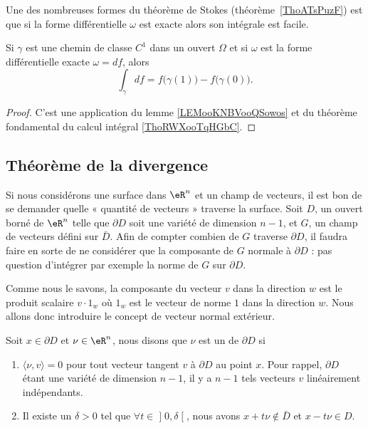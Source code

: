Une des nombreuses formes du théorème de Stokes (théorème~\ref{ThoATsPuzF}) est que si la forme différentielle \( \omega\) est exacte alors son intégrale est facile.
\begin{theorem} \label{ThoUJMhFwU}
	Si \( \gamma\) est une chemin de classe \( C^1\) dans un ouvert \( \Omega\) et si \( \omega\) est la forme différentielle exacte \( \omega=df\), alors
	\begin{equation}
		\int_{\gamma}df=f\big( \gamma(1) \big)-f\big( \gamma(0) \big).
	\end{equation}
\end{theorem}

\begin{proof}
	C'est une application du lemme \ref{LEMooKNBVooQSowos} et du théorème fondamental du calcul intégral \ref{ThoRWXooTqHGbC}.
\end{proof}

\subsection{Théorème de la divergence}

Si nous considérons une surface dans \( \eR^n\) et un champ de vecteurs, il est bon de se demander quelle « quantité de vecteurs » traverse la surface. Soit \( D\), un ouvert borné de \( \eR^n\) telle que \( \partial D\) soit une variété de dimension \( n-1\), et \( G\), un champ de vecteurs défini sur \( \bar D\). Afin de compter combien de \( G\) traverse \( \partial D\), il faudra faire en sorte de ne considérer que la composante de \( G\) normale à \( \partial D\) : pas question d'intégrer par exemple la norme de \( G\) sur \( \partial D\).

Comme nous le savons, la composante du vecteur \( v\) dans la direction \( w\) est le produit scalaire \( v\cdot 1_w\) où \( 1_w\) est le vecteur de norme \( 1\) dans la direction \( w\). Nous allons donc introduire le concept de vecteur normal extérieur.

\begin{definition}
	Soit \( x\in\partial D\) et \( \nu\in\eR^n\), nous disons que \( \nu\) est un  de \( \partial D\) si
	\begin{enumerate}

		\item
		      \( \langle \nu, v\rangle =0\) pour tout vecteur tangent \( v\) à \( \partial D\) au point \( x\). Pour rappel, \( \partial D\) étant une variété de dimension \( n-1\), il y a \( n-1\) tels vecteurs \( v\) linéairement indépendants.

		\item
		      Il existe un \( \delta>0\) tel que \( \forall t\in\mathopen] 0 , \delta \mathclose[\), nous avons \( x+t\nu\notin \bar D\) et \( x-t\nu\in D\).
	\end{enumerate}
\end{definition}

